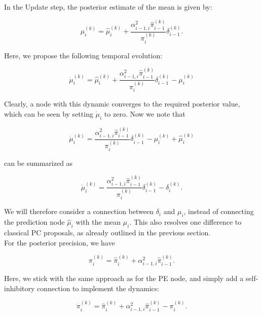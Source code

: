 In the \textsf{Update} step, the posterior estimate of the mean is given by:

\begin{equation}
	\mu_i^{(k)} = \hat{\mu}_i^{(k)} + \frac{\alpha_{i-1,i}^2 \hat{\pi}_{i-1}^{(k)}}{\pi_i^{(k)}} \delta_{i-1}^{(k)}.
\end{equation}

Here, we propose the following temporal evolution:

\begin{equation}
	\dot{\mu}_i^{(k)} = \hat{\mu}_i^{(k)} + \frac{\alpha_{i-1,i}^2 \hat{\pi}_{i-1}^{(k)}}{\pi_i^{(k)}} \delta_{i-1}^{(k)} - \mu_i^{(k)}
\end{equation}

Clearly, a node with this dynamic converges to the required posterior value, which can be seen by setting $\dot{\mu}_i$ to zero. Now we note that

\begin{equation}
	\dot{\mu}_i^{(k)} = \frac{\alpha_{i-1,i}^2 \hat{\pi}_{i-1}^{(k)}}{\pi_i^{(k)}} \delta_{i-1}^{(k)} - \mu_i^{(k)} + \hat{\mu}_i^{(k)}
\end{equation}

can be summarized as 

\begin{equation}
	\dot{\mu}_i^{(k)} = \frac{\alpha_{i-1,i}^2 \hat{\pi}_{i-1}^{(k)}}{\pi_i^{(k)}} \delta_{i-1}^{(k)} - \delta_i^{(k)}.
\end{equation}

We will therefore consider a connection between $\delta_i$ and $\mu_i$, instead of connecting the prediction node $\hat{\mu}_i$ with the mean $\mu_i$. This also resolves one difference to classical PC proposals, as already outlined in the previous section.\\

For the posterior precision, we have

\begin{equation}
	\pi_i^{(k)} = \hat{\pi}_i^{(k)} + \alpha_{i-1,i}^2 \hat{\pi}_{i-1}^{(k)}.
\end{equation}

Here, we stick with the same approach as for the \textsf{PE} node, and simply add a self-inhibitory connection to implement the dynamics:

\begin{equation}
	\dot{\pi}_i^{(k)} = \hat{\pi}_i^{(k)} + \alpha_{i-1,i}^2 \hat{\pi}_{i-1}^{(k)} - \pi_i^{(k)}.
\end{equation}

